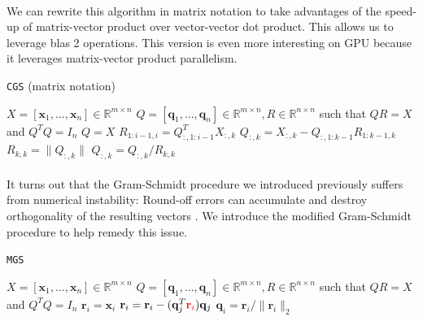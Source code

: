 \paragraph*{}
We can rewrite this algorithm in matrix notation to take advantages of the speed-up of matrix-vector product over vector-vector dot product. This allows us to leverage \acrshort{blas} 2 operations. This version is even more interesting on GPU because it leverages matrix-vector product parallelism.  

\begin{algorithm}
\caption{\texttt{CGS} (matrix notation)}\label{alg:cgs_mat}
\begin{algorithmic}[1]
\Require $X = [\mathbf{x}_1,...,\mathbf{x}_n] \in \mathbb{R}^{m\times n}$
\Ensure $ Q=[\mathbf{q}_1,...,\mathbf{q}_n] \in \mathbb{R}^{m\times n}, R \in \mathbb{R}^{n\times n}$ such that $QR = X$ and $Q^TQ=I_n$
\State $Q = X$
    \State $R_{1:i-1,i} = Q_{:,1:i-1}^T X_{:,k}$
    \State $Q_{:,k} = X_{:,k} - Q_{:,1:k-1} R_{1:k-1,k}$
    \State $R_{k,k} = \lVert Q_{:,k} \rVert$
    \State $Q_{:,k} = Q_{:,k}/R_{k,k}$
\EndFor
\end{algorithmic}
\end{algorithm}

\paragraph*{}
It turns out that the Gram-Schmidt procedure we introduced previously suffers from numerical instability: Round-off errors can accumulate and destroy orthogonality of the resulting vectors \cite{cgs1974}. We introduce the modified Gram-Schmidt procedure to help remedy this issue. 

\begin{algorithm}
\caption{\texttt{MGS}}\label{alg:mgs}
\begin{algorithmic}[1]
\Require $X = [\mathbf{x}_1,...,\mathbf{x}_n] \in \mathbb{R}^{m\times n}$
\Ensure $ Q=[\mathbf{q}_1,...,\mathbf{q}_n] \in \mathbb{R}^{m\times n}, R \in \mathbb{R}^{n\times n}$ such that $QR = X$ and $Q^TQ=I_n$
    \State $\mathbf{r}_i = \mathbf{x}_i$
        \State $\mathbf{r}_i = \mathbf{r}_i - (\mathbf{q}_j^T\textcolor{red}{\mathbf{r}_i})\mathbf{q}_j$
    \EndFor
    \State $\mathbf{q}_i = \mathbf{r}_i/ \lVert \mathbf{r}_i \rVert_2$
\EndFor
\end{algorithmic}
\end{algorithm}

